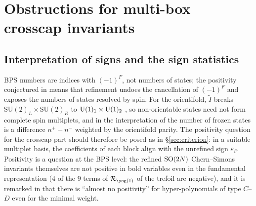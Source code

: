 \section{Obstructions for multi-box crosscap invariants}\label{sec:positivity}

\subsection{Interpretation of signs and the sign statistics}\label{sec:signs}
BPS numbers are indices with $(-1)^F$, not numbers of states; the positivity conjectured in \cite{KN17} means that refinement undoes the cancellation of $(-1)^F$ and exposes the numbers of states resolved by spin. For the orientifold, $\tilde I$ breaks $\mathrm{SU}(2)_L\times\mathrm{SU}(2)_R$ to $\mathrm{U}(1)_1\times\mathrm{U}(1)_2$ \cite{AgSc12}, so non-orientable states need not form complete spin multiplets, and in the interpretation of \cite{PU14} the number of frozen states is a difference $n^+ - n^-$ weighted by the orientifold parity. The positivity question for the crosscap part should therefore be posed as in \S\ref{sec:criterion}: in a suitable multiplet basis, the coefficients of each block align with the unrefined sign $\varepsilon_\beta$. Positivity is a question at the BPS level: the refined $\mathrm{SO}(2N)$ Chern--Simons invariants themselves are not positive in bold variables even in the fundamental representation (4 of the 9 terms of $\Rred_{\yone}$ of the trefoil are negative), and it is remarked in \cite{Cherednik11} that there is ``almost no positivity'' for hyper-polynomials of type $C$--$D$ even for the minimal weight.

